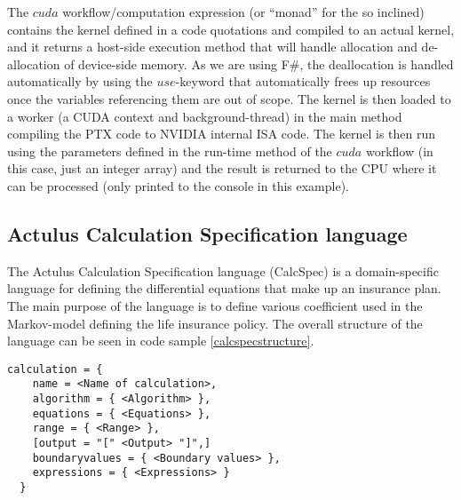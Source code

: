 The $cuda$ workflow/computation expression (or ``monad'' for the so inclined) contains the kernel defined in a code quotations and compiled to an actual kernel, and it returns a host-side execution method that will handle allocation and de-allocation of device-side memory. 
As we are using F\#, the deallocation is handled automatically by using the $use$-keyword that automatically frees up resources once the variables referencing them are out of scope. 
The kernel is then loaded to a worker (a CUDA context and background-thread) in the main method compiling the PTX code to NVIDIA internal ISA code. %
The kernel is then run using the parameters defined in the run-time method of the $cuda$ workflow (in this case, just an integer array) and the result is returned to the CPU where it can be processed (only printed to the console in this example).

\subsection{Actulus Calculation Specification language}
The Actulus Calculation Specification language (CalcSpec) is a domain-specific language for defining the differential equations that make up an insurance plan.
The main purpose of the language is to define various coefficient used in the Markov-model defining the life insurance policy.
The overall structure of the language can be seen in code sample \ref{calcspecstructure}.

\begin{lstlisting}[caption=CalcSpec structure, label=calcspecstructure]
calculation = {
    name = <Name of calculation>,
    algorithm = { <Algorithm> },
    equations = { <Equations> },
    range = { <Range> },
    [output = "[" <Output> "]",]
    boundaryvalues = { <Boundary values> },
    expressions = { <Expressions> }
  }
\end{lstlisting}


